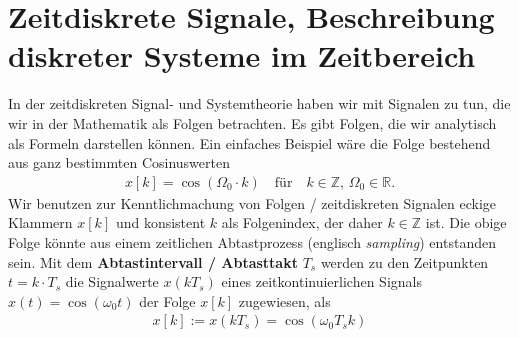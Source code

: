 \clearpage
\section{Zeitdiskrete Signale, Beschreibung diskreter Systeme im Zeitbereich}
%
In der zeitdiskreten Signal- und Systemtheorie haben wir mit Signalen zu tun,
die wir in der Mathematik als Folgen betrachten. Es gibt Folgen, die wir analytisch
als Formeln darstellen können.
Ein einfaches Beispiel wäre die Folge bestehend aus ganz bestimmten Cosinuswerten
\begin{align}
x[k] = \cos(\Omega_0 \cdot k)\quad\text{für}\quad k\in\mathbb{Z},\,\Omega_0\in\mathbb{R}.
\end{align}
Wir benutzen zur Kenntlichmachung von Folgen / zeitdiskreten Signalen eckige
Klammern $x[k]$ und konsistent $k$ als Folgenindex, der daher $k\in\mathbb{Z}$ ist.
%
Die obige Folge könnte aus einem zeitlichen Abtastprozess (englisch \textit{sampling})
entstanden sein. Mit dem
\textbf{Abtastintervall / Abtasttakt} $T_s$ werden zu den Zeitpunkten $t = k \cdot T_s$
die Signalwerte $x(k T_s)$ eines zeitkontinuierlichen Signals $x(t) = \cos(\omega_0 t)$
der Folge $x[k]$ zugewiesen, als
\begin{align}
x[k] := x(k T_s) = \cos(\omega_0 T_s k)
\end{align}


